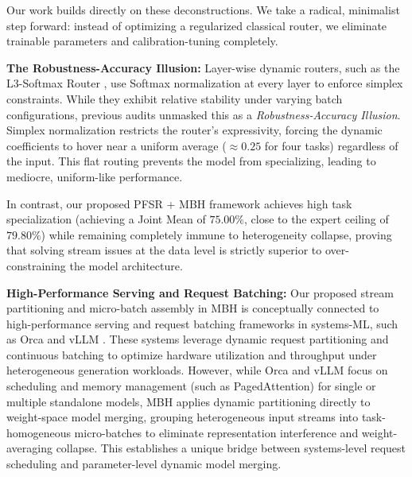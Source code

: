 Our work builds directly on these deconstructions. We take a radical, minimalist step forward: instead of optimizing a regularized classical router, we eliminate trainable parameters and calibration-tuning completely.

\textbf{The Robustness-Accuracy Illusion:} Layer-wise dynamic routers, such as the L3-Softmax Router \cite{PredecessorT5S5}, use Softmax normalization at every layer to enforce simplex constraints. While they exhibit relative stability under varying batch configurations, previous audits \cite{PredecessorT5S5} unmasked this as a \emph{Robustness-Accuracy Illusion}. Simplex normalization restricts the router's expressivity, forcing the dynamic coefficients to hover near a uniform average ($\approx 0.25$ for four tasks) regardless of the input. This flat routing prevents the model from specializing, leading to mediocre, uniform-like performance. 

In contrast, our proposed PFSR + MBH framework achieves high task specialization (achieving a Joint Mean of $75.00\%$, close to the expert ceiling of $79.80\%$) while remaining completely immune to heterogeneity collapse, proving that solving stream issues at the data level is strictly superior to over-constraining the model architecture.

\textbf{High-Performance Serving and Request Batching:} Our proposed stream partitioning and micro-batch assembly in MBH is conceptually connected to high-performance serving and request batching frameworks in systems-ML, such as Orca \cite{Yu2022} and vLLM \cite{Kwon2023}. These systems leverage dynamic request partitioning and continuous batching to optimize hardware utilization and throughput under heterogeneous generation workloads. However, while Orca and vLLM focus on scheduling and memory management (such as PagedAttention) for single or multiple standalone models, MBH applies dynamic partitioning directly to weight-space model merging, grouping heterogeneous input streams into task-homogeneous micro-batches to eliminate representation interference and weight-averaging collapse. This establishes a unique bridge between systems-level request scheduling and parameter-level dynamic model merging.

